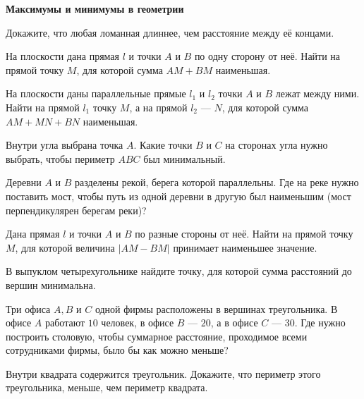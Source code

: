 \documentclass{article}
\begin{document}
    \large

    \begin{center}
        \textbf{Максимумы и минимумы в геометрии}
    \end{center}

    \begin{enumerate_boxed}

        \item Докажите, что любая ломанная длиннее, чем расстояние между её концами.

        \item На плоскости дана прямая $l$ и точки $A$ и $B$ по одну сторону от неё.
        Найти на прямой точку $M$, для которой сумма $AM +BM$ наименьшая.%

        \item На плоскости даны параллельные прямые $l_1$ и $l_2$ точки $A$ и $B$ лежат между ними.
        Найти на прямой $l_1$ точку $M$, а на прямой $l_2$ --- $N$, для которой сумма $AM + MN + BN$ наименьшая.%

        \item Внутри угла выбрана точка $A$.
        Какие точки $B$ и $C$ на сторонах угла нужно выбрать, чтобы периметр $ABC$ был минимальный. %

        \item Деревни $A$ и $B$ разделены рекой, берега которой параллельны.
        Где на реке нужно поставить мост, чтобы путь из одной деревни в другую был наименьшим (мост перпендикулярен берегам реки)? %

        \item Дана прямая $l$ и точки  $A$ и $B$ по разные стороны от неё.
        Найти на прямой точку $M$, для которой величина $|AM-BM|$ принимает наименьшее значение.%

        \item В выпуклом четырехугольнике найдите точку, для которой сумма расстояний до вершин минимальна. %

        \item Три офиса $A, B$ и $C$ одной фирмы расположены в вершинах треугольника.
        В офисе $A$ работают $10$ человек, в офисе $B$ --- $20$, а в офисе $C$ --- $30$.
        Где нужно построить столовую, чтобы суммарное расстояние, проходимое всеми сотрудниками фирмы, было бы как можно меньше? %

        \item Внутри квадрата содержится треугольник.
        Докажите, что периметр этого треугольника, меньше, чем периметр квадрата.


\end{enumerate_boxed}
\end{document}
